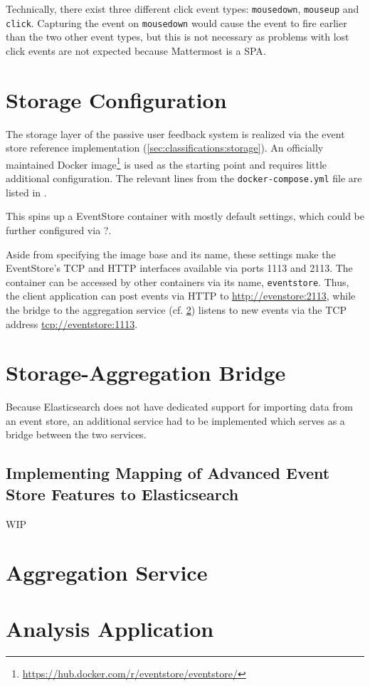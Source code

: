 Technically, there exist three different click event types: \texttt{mousedown}, \texttt{mouseup} and \texttt{click}.
Capturing the event on \texttt{mousedown} would cause the event to fire earlier than the two other event types, but this is not necessary as problems with lost click events are not expected because Mattermost is a \ac{SPA}.

\section{Storage Configuration}
\label{sec:implementation:storage}

The storage layer of the passive user feedback system is realized via the event store reference implementation (\cref{sec:classifications:storage}).
An officially maintained Docker image\footnote{\url{https://hub.docker.com/r/eventstore/eventstore/}} is used as the starting point and requires little additional configuration.
The relevant lines from the \texttt{docker-compose.yml} file are listed in .


This spins up a EventStore container with mostly default settings, which could be further configured via ?.

Aside from specifying the image base and its name, these settings make the EventStore's TCP and HTTP interfaces available via ports 1113 and 2113.
The container can be accessed by other containers via its name, \texttt{eventstore}.
Thus, the client application can post events via HTTP to \url{http://evenstore:2113}, while the bridge to the aggregation service (cf. \cref{sec:implementation:bridge}) listens to new events via the TCP address \url{tcp://eventstore:1113}.

\section{Storage-Aggregation Bridge}
\label{sec:implementation:bridge}

Because Elasticsearch does not have dedicated support for importing data from an event store, an additional service had to be implemented which serves as a bridge between the two services.

\subsection{Implementing Mapping of Advanced Event Store Features to Elasticsearch}
\label{subsec:implementation:bridge:mapping}

WIP

\section{Aggregation Service}
\label{sec:implementation:aggregation}

\section{Analysis Application}
\label{sec:implementation:analysis}

